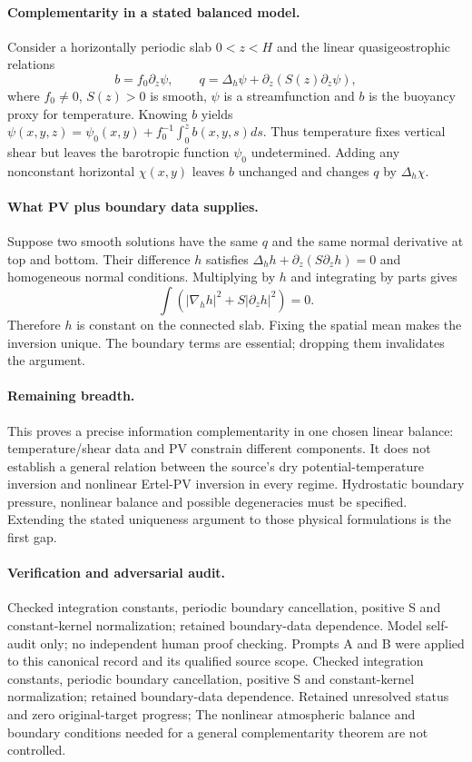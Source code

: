 \documentclass[11pt]{article}
\begin{document}
\paragraph{Complementarity in a stated balanced model.} Consider a horizontally periodic slab $0<z<H$ and the linear quasigeostrophic relations
\[
 b=f_0\partial_z\psi,\qquad q=\Delta_h\psi+\partial_z(S(z)\partial_z\psi),
\]
where $f_0\ne0$, $S(z)>0$ is smooth, $\psi$ is a streamfunction and $b$ is the buoyancy proxy for temperature. Knowing $b$ yields $\psi(x,y,z)=\psi_0(x,y)+f_0^{-1}\int_0^z b(x,y,s)ds$. Thus temperature fixes vertical shear but leaves the barotropic function $\psi_0$ undetermined. Adding any nonconstant horizontal $\chi(x,y)$ leaves $b$ unchanged and changes $q$ by $\Delta_h\chi$.

\paragraph{What PV plus boundary data supplies.} Suppose two smooth solutions have the same $q$ and the same normal derivative at top and bottom. Their difference $h$ satisfies $\Delta_hh+\partial_z(S\partial_zh)=0$ and homogeneous normal conditions. Multiplying by $h$ and integrating by parts gives
\[
 \int(|\nabla_hh|^2+S|\partial_zh|^2)=0.
\]
Therefore $h$ is constant on the connected slab. Fixing the spatial mean makes the inversion unique. The boundary terms are essential; dropping them invalidates the argument.

\paragraph{Remaining breadth.} This proves a precise information complementarity in one chosen linear balance: temperature/shear data and PV constrain different components. It does not establish a general relation between the source's dry potential-temperature inversion and nonlinear Ertel-PV inversion in every regime. Hydrostatic boundary pressure, nonlinear balance and possible degeneracies must be specified. Extending the stated uniqueness argument to those physical formulations is the first gap.

\paragraph{Verification and adversarial audit.}
Checked integration constants, periodic boundary cancellation, positive S and constant-kernel normalization; retained boundary-data dependence. Model self-audit only; no independent human proof checking. Prompts A and B were applied to this canonical record and its qualified source scope. Checked integration constants, periodic boundary cancellation, positive S and constant-kernel normalization; retained boundary-data dependence. Retained unresolved status and zero original-target progress; The nonlinear atmospheric balance and boundary conditions needed for a general complementarity theorem are not controlled.
\end{document}
